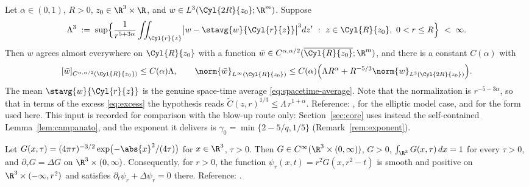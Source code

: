 \documentclass[11pt,reqno]{amsart}
\begin{document}
\begin{externalinput}
\label{ext:campanato}
Let $\alpha\in(0,1)$, $R>0$, $z_{0}\in\R^{3}\times\R$, and
$w\in L^{3}(\Cyl{2R}{z_{0}};\R^{m})$. Suppose
\[
  \Lambda^{3}\;:=\;\sup\Bigl\{\frac1{r^{5+3\alpha}}
    \iint_{\Cyl{r}{z}}\bigl|w-\stavg{w}{\Cyl{r}{z}}\bigr|^{3}dz'
    \ :\ z\in \Cyl{R}{z_{0}},\ 0<r\le R\Bigr\}\;<\;\infty .
\]
Then $w$ agrees almost everywhere on $\Cyl{R}{z_{0}}$ with a function
$\bar w\in C^{\alpha,\alpha/2}(\overline{\Cyl{R}{z_{0}}};\R^{m})$, and there is a
constant $C(\alpha)$ with
\[
  [\bar w]_{C^{\alpha,\alpha/2}(\Cyl{R}{z_{0}})}\le C(\alpha)\Lambda,
  \qquad
  \norm{\bar w}_{L^{\infty}(\Cyl{R}{z_{0}})}
   \le C(\alpha)\Bigl(\Lambda R^{\alpha}
     +R^{-5/3}\norm{w}_{L^{3}(\Cyl{2R}{z_{0}})}\Bigr).
\]
The mean $\stavg{w}{\Cyl{r}{z}}$ is the genuine space-time average
\eqref{eq:spacetime-average}. Note that the normalization is
$r^{-5-3\alpha}$, so that in terms of the excess \eqref{eq:excess} the
hypothesis reads $\widetilde C(z,r)^{1/3}\le\Lambda\,r^{1+\alpha}$.
Reference: \cite[\S4.2]{LadyzhenskayaSolonnikovUraltseva1968},
\cite[\S III.1]{Giaquinta1983} for the elliptic model case, and
\cite[after (6.24)]{Tsai2018} for the form used here. This input is recorded for
comparison with the blow-up route only: Section~\ref{sec:core} uses instead the
self-contained Lemma~\ref{lem:campanato}, and the exponent it delivers is
$\gamma_{0}=\min\{2-5/q,1/5\}$ (Remark~\ref{rem:exponent}).
\end{externalinput}

\begin{externalinput}\label{ext:heat}
Let $G(x,\tau)=(4\pi\tau)^{-3/2}\exp\bigl(-\abs{x}^{2}/(4\tau)\bigr)$ for
$x\in\R^{3}$, $\tau>0$. Then $G\in C^{\infty}(\R^{3}\times(0,\infty))$, $G>0$,
$\int_{\R^{3}}G(x,\tau)\,dx=1$ for every $\tau>0$, and
$\partial_{\tau}G=\Delta G$ on $\R^{3}\times(0,\infty)$. Consequently, for
$r>0$, the function $\psi_{r}(x,t)=r^{2}G(x,r^{2}-t)$ is smooth and positive on
$\R^{3}\times(-\infty,r^{2})$ and satisfies
$\partial_{t}\psi_{r}+\Delta\psi_{r}=0$ there.
Reference: \cite[Ch.~2]{Tsai2018}.
\end{externalinput}
\end{document}

